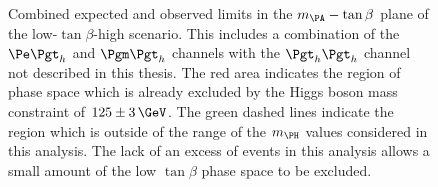 \begin{figure}
\begin{center}

\end{center}
\caption[Combined expected and observed limits in the $m_{\PA}-\tan\beta$ plane
of the low-$\tan\beta$-high scenario.]{
Combined expected and observed limits in the $m_{\PA}-\tan\beta$ plane
of the low-$\tan\beta$-high scenario.
This includes a combination of the $\etau$ and $\mutau$ channels with the $\tautau$ channel not
described in this thesis. The red area indicates the region of phase space which is already
excluded by the Higgs boson mass constraint of $125\pm3\,\GeV$. The green dashed
lines indicate the region which is outside of the range of the $m_{\PH}$ values
considered in this analysis. The lack of an excess of events in this analysis
allows a small amount of the low $\tan\beta$ phase space to be excluded.}
\label{fig:lowtanbhigh}
\end{figure}
